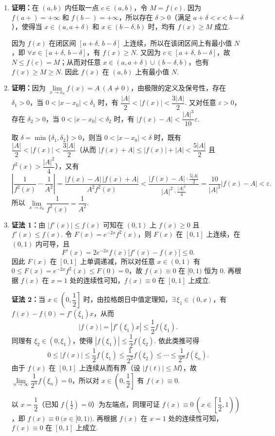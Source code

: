 \documentclass[a4paper,11pt]{ctexart}
\begin{document}
\begin{enumerate}[label=\arabic*., leftmargin=2em, itemsep=0.9em, topsep=0.4em]
  \item \textbf{证明：}在 $(a,b)$ 内任取一点 $c\in(a,b)$，令 $M=f(c)$. 因为 $f(a+)=+\infty$ 和 $f(b-)=+\infty$，所以存在 $\delta>0$（满足 $a+\delta<c<b-\delta$），使得当 $x\in(a,a+\delta)$ 和 $x\in(b-\delta,b)$ 时，均有 $f(x)\ge M$ 成立.

  因为 $f(x)$ 在闭区间 $[a+\delta,\,b-\delta]$ 上连续，所以在该闭区间上有最小值 $N$，即 $\forall x\in[a+\delta,\,b-\delta]$，有 $f(x)\ge N$. 又因为 $c\in[a+\delta,\,b-\delta]$，故 $N\le f(c)=M$；从而对任意 $x\in(a,a+\delta)\cup(b-\delta,b)$，也有 $f(x)\ge M\ge N$. 因此 $f(x)$ 在 $(a,b)$ 上有最小值 $N$.

  \item \textbf{证明：}因为 $\lim\limits_{x\to x_0}f(x)=A\ (A\neq 0)$，由极限的定义及保号性，存在 $\delta_1>0$，当 $0<|x-x_0|<\delta_1$ 时，有 $\dfrac{|A|}{2}<|f(x)|<\dfrac{3|A|}{2}$. 又对任意 $\varepsilon>0$，存在 $\delta_2>0$，当 $0<|x-x_0|<\delta_2$ 时，有 $|f(x)-A|<\dfrac{|A|^3}{10}\varepsilon$.

  取 $\delta=\min\{\delta_1,\delta_2\}>0$，则当 $0<|x-x_0|<\delta$ 时，既有 $\dfrac{|A|}{2}<|f(x)|<\dfrac{3|A|}{2}$（从而 $|f(x)+A|\le |f(x)|+|A|<\dfrac{5|A|}{2}$ 且 $f^2(x)>\dfrac{|A|^2}{4}$），又有
  \[
    \left|\frac{1}{f^2(x)}-\frac{1}{A^2}\right|
    =\frac{|f(x)-A|\,|f(x)+A|}{A^2 f^2(x)}
    <\frac{|f(x)-A|\cdot \frac{5|A|}{2}}{|A|^2\cdot \frac{|A|^2}{4}}
    =\frac{10}{|A|^3}|f(x)-A|
    <\varepsilon.
  \]
  所以 $\lim\limits_{x\to x_0}\dfrac{1}{f^2(x)}=\dfrac{1}{A^2}$.

  \item \textbf{证法 1：}由 $|f'(x)|\le f(x)$ 可知在 $(0,1)$ 上 $f(x)\ge 0$ 且 $f'(x)\le f(x)$. 令 $F(x)=e^{-2x}f^2(x)$，则 $F(x)$ 在 $[0,1]$ 上连续，在 $(0,1)$ 内可导，且
  \[
    F'(x)=2e^{-2x}f(x)\bigl[f'(x)-f(x)\bigr]\le 0.
  \]
  因此 $F(x)$ 在 $[0,1]$ 上单调递减，所以对任意 $x\in(0,1)$ 有 $0\le F(x)=e^{-2x}f^2(x)\le F(0)=0$，故 $f(x)\equiv 0$ 在 $[0,1)$ 恒为 $0$. 再根据 $f(x)$ 在 $x=1$ 处的连续性可知，$f(x)\equiv 0$ 在 $[0,1]$ 上成立.

  \textbf{证法 2：}当 $x\in\left(0,\dfrac{1}{2}\right]$ 时，由拉格朗日中值定理知，$\exists\,\xi_1\in(0,x)$，有 $f(x)-f(0)=f'(\xi_1)x$，从而
  \[
    |f(x)|=|f'(\xi_1)x|\le \frac{1}{2}f(\xi_1).
  \]
  同理有 $\xi_2\in(0,\xi_1)$，使得 $|f(\xi_1)|\le \dfrac{1}{2}f(\xi_2)$. 依此类推可得
  \[
    0\le |f(x)|\le \frac{1}{2}f(\xi_1)\le \frac{1}{2^2}f(\xi_2)\le \cdots \le \frac{1}{2^n}f(\xi_n).
  \]
  由于 $f(x)$ 在 $[0,1]$ 上连续从而有界（设 $|f(t)|\le M$），故 $\lim\limits_{n\to\infty}\dfrac{1}{2^n}f(\xi_n)=0$，所以对 $x\in\left(0,\dfrac{1}{2}\right]$ 有 $f(x)\equiv 0$.

  以 $x=\dfrac{1}{2}$（已知 $f\left(\frac{1}{2}\right)=0$）为左端点，同理可证 $f(x)\equiv 0\ \left(x\in\left[\dfrac{1}{2},1\right)\right)$，即 $f(x)\equiv 0\ \bigl(x\in[0,1)\bigr)$. 再根据 $f(x)$ 在 $x=1$ 处的连续性可知，$f(x)\equiv 0$ 在 $[0,1]$ 上成立.
\end{enumerate}
\end{document}
